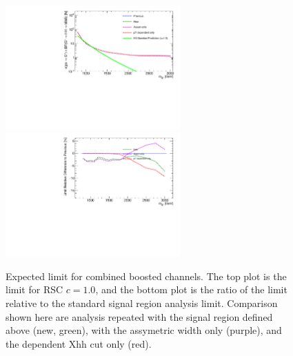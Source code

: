 \begin{figure}[htbp!]
\begin{center}
\includegraphics[angle=270, width=0.6\textwidth]{./figures/boosted/AppendixOptimization/CompareLimits_HH_BoostedNewRun2-test-SR_c10.pdf}\\
\includegraphics[angle=270, width=0.6\textwidth]{./figures/boosted/AppendixOptimization/CompareLimits_HH_BoostedNewRun2-test-SR_c10_ratio.pdf}
  \caption{Expected limit for combined boosted channels. The top plot is the limit for RSC $c=1.0$, and the bottom plot is the ratio of the limit relative to the standard signal region analysis limit. Comparison shown here are analysis repeated with the signal region defined above (new, green), with the assymetric width only (purple), and the \pt dependent Xhh cut only (red).}
  \label{fig:app-optimization-sr}
\end{center}
\end{figure}

